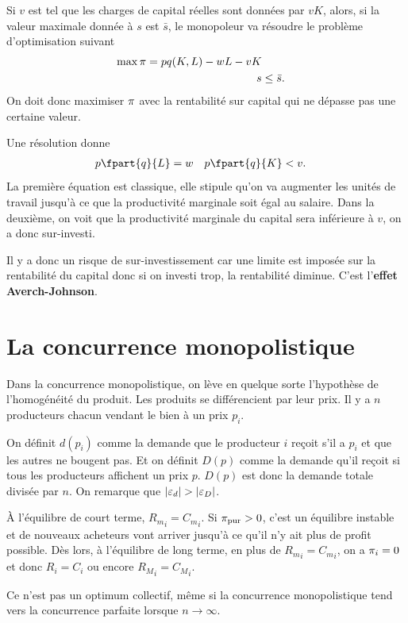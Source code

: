 \begin{itemize}
    Si $v$ est tel que les charges de capital réelles sont données par
    $vK$, alors, si la valeur maximale donnée à $s$ est $\bar{s}$,
    le monopoleur va résoudre le problème d'optimisation suivant
    \begin{align*}
      \max \pi = pq(K,L) - wL - vK\\
      s & \leq \bar{s}.
    \end{align*}
    On doit donc maximiser $\pi$ avec la rentabilité sur capital
    qui ne dépasse pas une certaine valeur.

    Une résolution donne
    \begin{align*}
      p \fpart{q}{L} & = w & p \fpart{q}{K} & < v.
    \end{align*}
    La première équation est classique, elle stipule qu'on va
    augmenter les unités de travail jusqu'à ce que la productivité
    marginale soit égal au salaire.
    Dans la deuxième, on voit que la productivité marginale du capital
    sera inférieure à $v$, on a donc sur-investi.

    Il y a donc un risque de sur-investissement car
    une limite est imposée sur la rentabilité du capital donc si on investi
    trop, la rentabilité diminue.
    C'est l'\textbf{effet Averch-Johnson}.
\end{itemize}

\section{La concurrence monopolistique}
Dans la concurrence monopolistique, on lève en quelque sorte l'hypothèse de
l'homogénéité du produit.
Les produits se différencient par leur prix.
Il y a $n$ producteurs chacun vendant le bien à un prix $p_i$.

On définit $d(p_i)$ comme la demande que le producteur $i$ reçoit s'il a
$p_i$ et que les autres ne bougent pas.
Et on définit $D(p)$ comme la demande qu'il reçoit si tous
les producteurs affichent un prix $p$.
$D(p)$ est donc la demande totale divisée par $n$.
On remarque que $|\varepsilon_d| > |\varepsilon_D|$.

À l'équilibre de court terme, ${R_m}_i = {C_m}_i$.
Si $\pi_{\mathrm{pur}} > 0$, c'est un équilibre instable et de nouveaux
acheteurs vont arriver jusqu'à ce qu'il n'y ait plus de profit possible.
Dès lors, à l'équilibre de long terme,
en plus de ${R_m}_i = {C_m}_i$, on a $\pi_i = 0$ et donc $R_i = C_i$
ou encore ${R_M}_i = {C_M}_i$.

Ce n'est pas un optimum collectif, même si la concurrence monopolistique
tend vers la concurrence parfaite lorsque $n \to \infty$.

